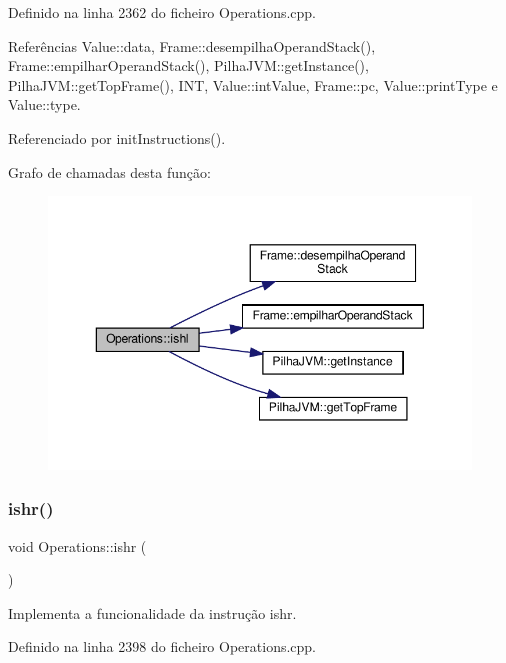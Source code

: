 Definido na linha 2362 do ficheiro Operations.\+cpp.



Referências Value\+::data, Frame\+::desempilha\+Operand\+Stack(), Frame\+::empilhar\+Operand\+Stack(), Pilha\+J\+V\+M\+::get\+Instance(), Pilha\+J\+V\+M\+::get\+Top\+Frame(), I\+NT, Value\+::int\+Value, Frame\+::pc, Value\+::print\+Type e Value\+::type.



Referenciado por init\+Instructions().

Grafo de chamadas desta função\+:\nopagebreak
\begin{figure}[H]
\begin{center}
\leavevmode
\includegraphics[width=350pt]{classOperations_a3139bbe41519fb4761ecd7e2a8ddb994_cgraph}
\end{center}
\end{figure}
\mbox{\label{classOperations_aa67d92582121939b307658d417b34d3c}} 
\subsubsection{\texorpdfstring{ishr()}{ishr()}}
{\footnotesize\ttfamily void Operations\+::ishr (\begin{DoxyParamCaption}{ }\end{DoxyParamCaption})\hspace{0.3cm}{\ttfamily [private]}}



Implementa a funcionalidade da instrução ishr. 



Definido na linha 2398 do ficheiro Operations.\+cpp.



